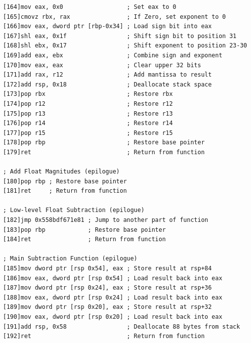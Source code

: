 \documentclass[12pt,letter]{article}
\begin{document}
\begin{lstlisting}[style=rust, caption={Annotated IEE-754 Binary32 Normal Subtraction ASM Trace}, label={fig:ieee_subtract}]
[164]mov eax, 0x0                  ; Set eax to 0
[165]cmovz rbx, rax                ; If Zero, set exponent to 0
[166]mov eax, dword ptr [rbp-0x34] ; Load sign bit into eax
[167]shl eax, 0x1f                 ; Shift sign bit to position 31
[168]shl ebx, 0x17                 ; Shift exponent to position 23-30
[169]add eax, ebx                  ; Combine sign and exponent
[170]mov eax, eax                  ; Clear upper 32 bits
[171]add rax, r12                  ; Add mantissa to result
[172]add rsp, 0x18                 ; Deallocate stack space
[173]pop rbx                       ; Restore rbx
[174]pop r12                       ; Restore r12
[175]pop r13                       ; Restore r13
[176]pop r14                       ; Restore r14
[177]pop r15                       ; Restore r15
[178]pop rbp                       ; Restore base pointer
[179]ret                           ; Return from function

; Add Float Magnitudes (epilogue)
[180]pop rbp ; Restore base pointer
[181]ret     ; Return from function

; Low-level Float Subtraction (epilogue)
[182]jmp 0x558bdf671e81 ; Jump to another part of function
[183]pop rbp            ; Restore base pointer
[184]ret                ; Return from function

; Main Subtraction Function (epilogue)
[185]mov dword ptr [rsp 0x54], eax ; Store result at rsp+84
[186]mov eax, dword ptr [rsp 0x54] ; Load result back into eax
[187]mov dword ptr [rsp 0x24], eax ; Store result at rsp+36
[188]mov eax, dword ptr [rsp 0x24] ; Load result back into eax
[189]mov dword ptr [rsp 0x20], eax ; Store result at rsp+32
[190]mov eax, dword ptr [rsp 0x20] ; Load result back into eax
[191]add rsp, 0x58                 ; Deallocate 88 bytes from stack
[192]ret                           ; Return from function

\end{lstlisting}
\end{document}
